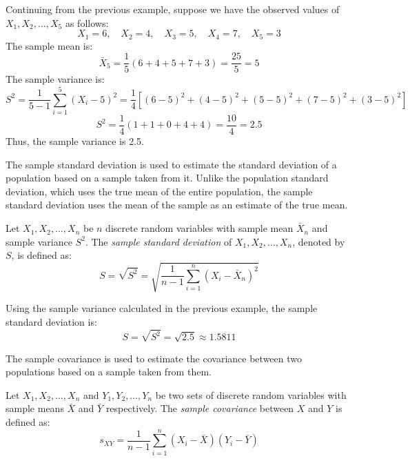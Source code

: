 \begin{example}
Continuing from the previous example, suppose we have the observed values of \( X_1, X_2, \ldots, X_5 \) as follows:
\[
X_1 = 6, \quad X_2 = 4, \quad X_3 = 5, \quad X_4 = 7, \quad X_5 = 3
\]
The sample mean is:
\[
\bar{X}_5 = \frac{1}{5} \left( 6 + 4 + 5 + 7 + 3 \right) = \frac{25}{5} = 5
\]
The sample variance is:
\[
S^2 = \frac{1}{5 - 1} \sum_{i=1}^{5} \left( X_i - 5 \right)^2 = \frac{1}{4} \left[ (6 - 5)^2 + (4 - 5)^2 + (5 - 5)^2 + (7 - 5)^2 + (3 - 5)^2 \right]
\]
\[
S^2 = \frac{1}{4} \left( 1 + 1 + 0 + 4 + 4 \right) = \frac{10}{4} = 2.5
\]
Thus, the sample variance is 2.5.
\end{example}

The sample standard deviation is used to estimate the standard deviation of a population based on a sample taken from it. Unlike the population standard deviation, which uses the true mean of the entire population, the sample standard deviation uses the mean of the sample as an estimate of the true mean.

\begin{definition}
Let \( X_1, X_2, \ldots, X_n \) be \( n \) discrete random variables with sample mean \( \bar{X}_n \) and sample variance \( S^2 \). The \emph{sample standard deviation} of \( X_1, X_2, \ldots, X_n \), denoted by \( S \), is defined as:
\[
S = \sqrt{S^2} = \sqrt{ \frac{1}{n - 1} \sum_{i=1}^{n} \left( X_i - \bar{X}_n \right)^2 }
\]
\end{definition}

\begin{example}
Using the sample variance calculated in the previous example, the sample standard deviation is:
\[
S = \sqrt{S^2} = \sqrt{2.5} \approx 1.5811
\]
\end{example}

The sample covariance is used to estimate the covariance between two populations based on a sample taken from them.

\begin{definition}
Let \( X_1, X_2, \ldots, X_n \) and \( Y_1, Y_2, \ldots, Y_n \) be two sets of discrete random variables with sample means \( \bar{X} \) and \( \bar{Y} \) respectively. The \emph{sample covariance} between \( X \) and \( Y \) is defined as:
\[
s_{XY} = \frac{1}{n - 1} \sum_{i=1}^n \left( X_i - \bar{X} \right) \left( Y_i - \bar{Y} \right)
\]
\end{definition}

